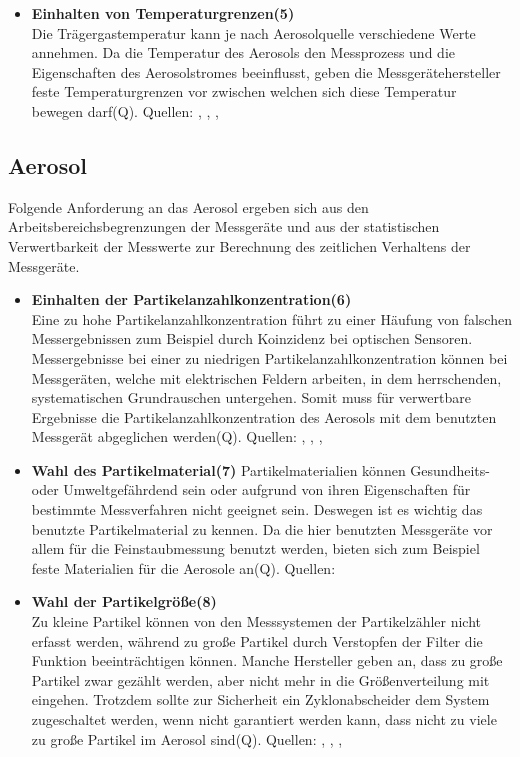 \begin{itemize}
\item \textbf{Einhalten von Temperaturgrenzen(5)}\\ 
Die Tr\"{a}gergastemperatur kann je nach Aerosolquelle verschiedene Werte annehmen. Da die Temperatur des Aerosols den Messprozess und die Eigenschaften des Aerosolstromes beeinflusst, geben die Messger\"{a}tehersteller feste Temperaturgrenzen vor zwischen welchen sich diese Temperatur bewegen darf(Q). 
Quellen: \cite{fmps_3091}, \cite{ops_3330}, \cite{aps_3321}, \cite{ucpc_3776}
\end{itemize}

\subsection{Aerosol}
Folgende Anforderung an das Aerosol ergeben sich aus den Arbeitsbereichsbegrenzungen der Messger\"{a}te und aus der statistischen Verwertbarkeit der Messwerte zur Berechnung des zeitlichen Verhaltens der Messger\"{a}te.

\begin{itemize}
\item \textbf{Einhalten der Partikelanzahlkonzentration(6)}\\
Eine zu hohe Partikelanzahlkonzentration f\"{u}hrt zu einer H\"{a}ufung von falschen Messergebnissen zum Beispiel durch Koinzidenz bei optischen Sensoren. Messergebnisse bei einer zu niedrigen Partikelanzahlkonzentration k\"{o}nnen bei Messger\"{a}ten, welche mit elektrischen Feldern arbeiten, in dem herrschenden, systematischen Grundrauschen untergehen. Somit muss f\"{u}r verwertbare Ergebnisse die Partikelanzahlkonzentration des Aerosols mit dem benutzten Messger\"{a}t abgeglichen werden(Q).
Quellen: \cite{fmps_3091}, \cite{ops_3330}, \cite{aps_3321}, \cite{ucpc_3776}

\item \textbf{Wahl des Partikelmaterial(7)} 
Partikelmaterialien k\"{o}nnen Gesundheits- oder Umweltgef\"{a}hrdend sein oder aufgrund von ihren Eigenschaften f\"{u}r bestimmte Messverfahren nicht geeignet sein. Deswegen ist es wichtig das benutzte Partikelmaterial zu kennen. Da die hier benutzten Messger\"{a}te vor allem f\"{u}r die Feinstaubmessung benutzt werden, bieten sich zum Beispiel feste Materialien f\"{u}r die Aerosole an(Q).
Quellen: \cite{vdi3491}

\item \textbf{Wahl der Partikelgr\"{o}{\ss}e(8)}\\ 
Zu kleine Partikel k\"{o}nnen von den Messsystemen der Partikelz\"{a}hler nicht erfasst werden, w\"{a}hrend zu gro{\ss}e Partikel durch Verstopfen der Filter die Funktion beeintr\"{a}chtigen k\"{o}nnen. Manche Hersteller geben an, dass zu gro{\ss}e Partikel zwar gez\"{a}hlt werden, aber nicht mehr in die Gr\"{o}{\ss}enverteilung mit eingehen. Trotzdem sollte zur Sicherheit ein Zyklonabscheider dem System zugeschaltet werden, wenn nicht garantiert werden kann, dass nicht zu viele zu gro{\ss}e Partikel im Aerosol sind(Q).
Quellen: \cite{fmps_3091}, \cite{ops_3330}, \cite{aps_3321}, \cite{ucpc_3776}
\end{itemize}

